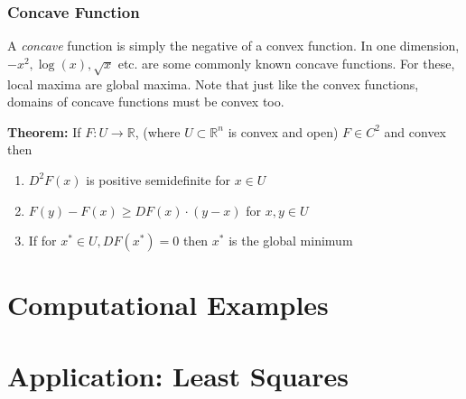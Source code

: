 \documentclass[11pt,]{article}
\providecommand{\tightlist}{%
  \setlength{\itemsep}{0pt}\setlength{\parskip}{0pt}}
\begin{document}
\subsubsection{Concave Function}\label{concave-function}

A \emph{concave} function is simply the negative of a convex function.
In one dimension, \(-x^2, \log(x), \sqrt{x}\) etc. are some commonly
known concave functions. For these, local maxima are global maxima. Note
that just like the convex functions, domains of concave functions must
be convex too.

\textbf{Theorem:} If \(F:U \to \mathbb{R}\), (where
\(U\subset \mathbb{R}^n\) is convex and open) \(F\in C^2\) and convex
then

\begin{enumerate}
\def\labelenumi{\arabic{enumi}.}
\tightlist
\item
  \(D^2F(x)\) is positive semidefinite for \(x\in U\)
\item
  \(F(y)-F(x)\geq DF(x)\cdot(y-x)\) for \(x, y\in U\)
\item
  If for \(x^*\in U, DF(x^*)=0\) then \(x^*\) is the global minimum
\end{enumerate}

\section{Computational Examples}\label{computational-examples}

\section{Application: Least Squares}\label{application-least-squares}
\end{document}
